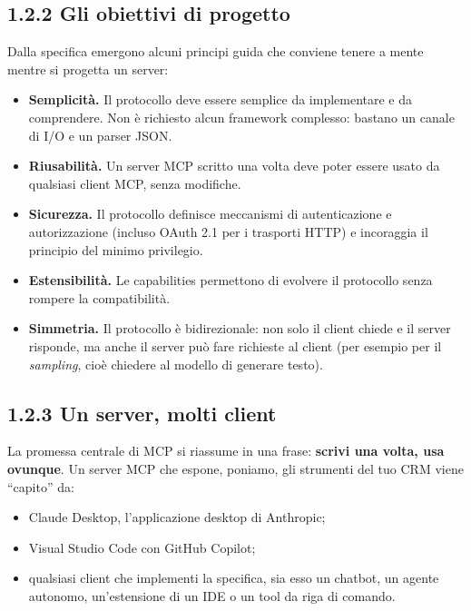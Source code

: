 \documentclass[
  italian,
  10pt,
]{book}
\providecommand{\tightlist}{%
  \setlength{\itemsep}{0pt}\setlength{\parskip}{0pt}}
\begin{document}
\subsection{1.2.2 Gli obiettivi di
progetto}\label{gli-obiettivi-di-progetto}

Dalla specifica emergono alcuni principi guida che conviene tenere a
mente mentre si progetta un server:

\begin{itemize}
\tightlist
\item
  \textbf{Semplicità.} Il protocollo deve essere semplice da
  implementare e da comprendere. Non è richiesto alcun framework
  complesso: bastano un canale di I/O e un parser JSON.
\item
  \textbf{Riusabilità.} Un server MCP scritto una volta deve poter
  essere usato da qualsiasi client MCP, senza modifiche.
\item
  \textbf{Sicurezza.} Il protocollo definisce meccanismi di
  autenticazione e autorizzazione (incluso OAuth 2.1 per i trasporti
  HTTP) e incoraggia il principio del minimo privilegio.
\item
  \textbf{Estensibilità.} Le capabilities permettono di evolvere il
  protocollo senza rompere la compatibilità.
\item
  \textbf{Simmetria.} Il protocollo è bidirezionale: non solo il client
  chiede e il server risponde, ma anche il server può fare richieste al
  client (per esempio per il \emph{sampling}, cioè chiedere al modello
  di generare testo).
\end{itemize}

\subsection{1.2.3 Un server, molti client}\label{un-server-molti-client}

La promessa centrale di MCP si riassume in una frase: \textbf{scrivi una
volta, usa ovunque}. Un server MCP che espone, poniamo, gli strumenti
del tuo CRM viene ``capito'' da:

\begin{itemize}
\tightlist
\item
  Claude Desktop, l'applicazione desktop di Anthropic;
\item
  Visual Studio Code con GitHub Copilot;
\item
  qualsiasi client che implementi la specifica, sia esso un chatbot, un
  agente autonomo, un'estensione di un IDE o un tool da riga di comando.
\end{itemize}
\end{document}
